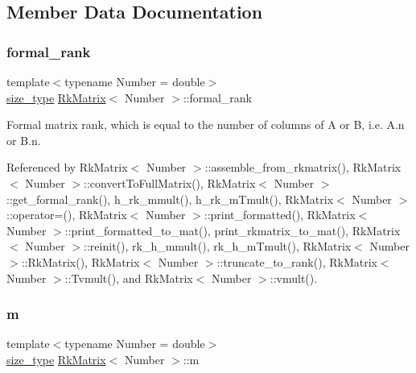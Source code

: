 \subsection{Member Data Documentation}
\mbox{\label{classRkMatrix_a7e4a8f0500daba627665c6a5ed8888d9}} 
\subsubsection{\texorpdfstring{formal\+\_\+rank}{formal\_rank}}
{\footnotesize\ttfamily template$<$typename Number = double$>$ \\
\hyperlink{classRkMatrix_add060bfc3a4cc77f858c3d6dd58cadd5}{size\+\_\+type} \hyperlink{classRkMatrix}{Rk\+Matrix}$<$ Number $>$\+::formal\+\_\+rank\hspace{0.3cm}{\ttfamily [private]}}

Formal matrix rank, which is equal to the number of columns of {\ttfamily A} or {\ttfamily B}, i.\+e. {\ttfamily A.\+n} or {\ttfamily B.\+n}. 

Referenced by Rk\+Matrix$<$ Number $>$\+::assemble\+\_\+from\+\_\+rkmatrix(), Rk\+Matrix$<$ Number $>$\+::convert\+To\+Full\+Matrix(), Rk\+Matrix$<$ Number $>$\+::get\+\_\+formal\+\_\+rank(), h\+\_\+rk\+\_\+mmult(), h\+\_\+rk\+\_\+m\+Tmult(), Rk\+Matrix$<$ Number $>$\+::operator=(), Rk\+Matrix$<$ Number $>$\+::print\+\_\+formatted(), Rk\+Matrix$<$ Number $>$\+::print\+\_\+formatted\+\_\+to\+\_\+mat(), print\+\_\+rkmatrix\+\_\+to\+\_\+mat(), Rk\+Matrix$<$ Number $>$\+::reinit(), rk\+\_\+h\+\_\+mmult(), rk\+\_\+h\+\_\+m\+Tmult(), Rk\+Matrix$<$ Number $>$\+::\+Rk\+Matrix(), Rk\+Matrix$<$ Number $>$\+::truncate\+\_\+to\+\_\+rank(), Rk\+Matrix$<$ Number $>$\+::\+Tvmult(), and Rk\+Matrix$<$ Number $>$\+::vmult().

\mbox{\label{classRkMatrix_a8ca8898bcfedeee135437833f83b144c}} 
\subsubsection{\texorpdfstring{m}{m}}
{\footnotesize\ttfamily template$<$typename Number = double$>$ \\
\hyperlink{classRkMatrix_add060bfc3a4cc77f858c3d6dd58cadd5}{size\+\_\+type} \hyperlink{classRkMatrix}{Rk\+Matrix}$<$ Number $>$\+::m\hspace{0.3cm}{\ttfamily [private]}}

